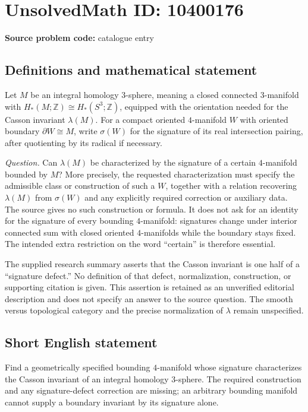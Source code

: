 \documentclass[11pt]{article}
\newcommand{\Z}{\mathbb{Z}}
\begin{document}
\section*{UnsolvedMath ID: 10400176}
\textbf{Source problem code:} catalogue entry
\subsection{Definitions and mathematical statement}
Let \(M\) be an integral homology \(3\)-sphere, meaning a closed connected \(3\)-manifold with \(H_*(M;\Z)\cong H_*(S^3;\Z)\), equipped with the orientation needed for the Casson invariant \(\lambda(M)\). For a compact oriented \(4\)-manifold \(W\) with oriented boundary \(\partial W\cong M\), write \(\sigma(W)\) for the signature of its real intersection pairing, after quotienting by its radical if necessary.

\emph{Question.} Can \(\lambda(M)\) be characterized by the signature of a certain \(4\)-manifold bounded by \(M\)? More precisely, the requested characterization must specify the admissible class or construction of such a \(W\), together with a relation recovering \(\lambda(M)\) from \(\sigma(W)\) and any explicitly required correction or auxiliary data. The source gives no such construction or formula. It does not ask for an identity for the signature of every bounding \(4\)-manifold: signatures change under interior connected sum with closed oriented \(4\)-manifolds while the boundary stays fixed. The intended extra restriction on the word ``certain'' is therefore essential.

The supplied research summary asserts that the Casson invariant is one half of a ``signature defect.'' No definition of that defect, normalization, construction, or supporting citation is given. This assertion is retained as an unverified editorial description and does not specify an answer to the source question. The smooth versus topological category and the precise normalization of \(\lambda\) remain unspecified.
\subsection{Short English statement}
Find a geometrically specified bounding \(4\)-manifold whose signature characterizes the Casson invariant of an integral homology \(3\)-sphere. The required construction and any signature-defect correction are missing; an arbitrary bounding manifold cannot supply a boundary invariant by its signature alone.
\end{document}
